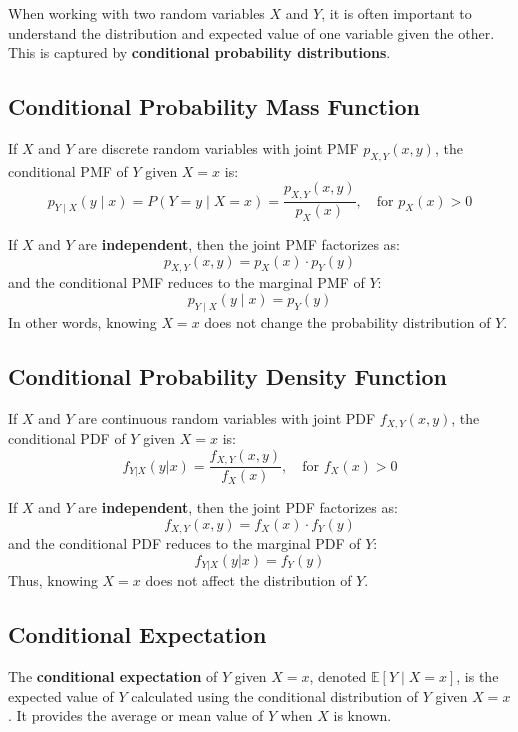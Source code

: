 \documentclass[twoside]{book}
\begin{document}
When working with two random variables \( X \) and \( Y \), it is often important to understand the distribution and expected value of one variable given the other. This is captured by \textbf{conditional probability distributions}.

\subsection{Conditional Probability Mass Function}

If \( X \) and \( Y \) are discrete random variables with joint PMF \( p_{X,Y}(x, y) \), the conditional PMF of \( Y \) given \( X = x \) is:
    \[
    p_{Y\mid X}(y\mid x) = P(Y = y \mid X = x) = \frac{p_{X,Y}(x, y)}{p_X(x)}, \quad \text{for } p_X(x) > 0
    \]

If \( X \) and \( Y \) are \textbf{independent}, then the joint PMF factorizes as:
\[
p_{X,Y}(x, y) = p_X(x) \cdot p_Y(y)
\]
and the conditional PMF reduces to the marginal PMF of \( Y \):
\[
p_{Y\mid X}(y\mid x) = p_Y(y)
\]
In other words, knowing \( X = x \) does not change the probability distribution of \( Y \).

\subsection{Conditional Probability Density Function}

If \( X \) and \( Y \) are continuous random variables with joint PDF \( f_{X,Y}(x,y) \), the conditional PDF of \( Y \) given \( X = x \) is:
    \[
    f_{Y|X}(y|x) = \frac{f_{X,Y}(x,y)}{f_X(x)}, \quad \text{for } f_X(x) > 0
    \]

If \( X \) and \( Y \) are \textbf{independent}, then the joint PDF factorizes as:
\[
f_{X,Y}(x,y) = f_X(x) \cdot f_Y(y)
\]
and the conditional PDF reduces to the marginal PDF of \( Y \):
\[
f_{Y|X}(y|x) = f_Y(y)
\]
Thus, knowing \( X = x \) does not affect the distribution of \( Y \).


\subsection{Conditional Expectation}

The \textbf{conditional expectation} of \( Y \) given \( X = x \), denoted \( \mathbb{E}[Y \mid X = x] \), is the expected value of \( Y \) calculated using the conditional distribution of \( Y \) given \( X = x \). It provides the average or mean value of \( Y \) when \( X \) is known.
\end{document}
